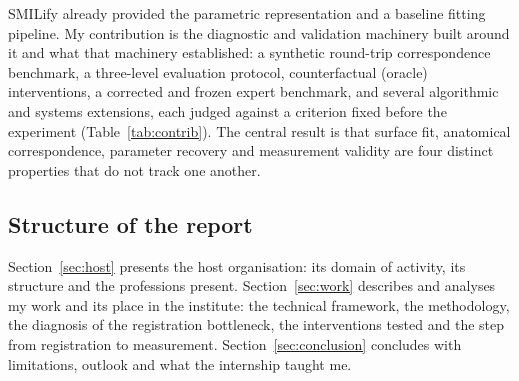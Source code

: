 SMILify already provided the parametric representation and a baseline fitting
pipeline. My contribution is the diagnostic and validation machinery built
around it and what that machinery established: a synthetic round-trip
correspondence benchmark, a three-level evaluation protocol, counterfactual
(oracle) interventions, a corrected and frozen expert benchmark, and several
algorithmic and systems extensions, each judged against a criterion fixed
before the experiment (Table~\ref{tab:contrib}). The central result is that
surface fit, anatomical correspondence, parameter recovery and measurement
validity are four distinct properties that do not track one another.

\subsection{Structure of the report}

Section~\ref{sec:host} presents the host organisation: its domain of activity,
its structure and the professions present. Section~\ref{sec:work} describes and
analyses my work and its place in the institute: the technical framework, the
methodology, the diagnosis of the registration bottleneck, the interventions
tested and the step from registration to measurement. Section~\ref{sec:conclusion}
concludes with limitations, outlook and what the internship taught me.
